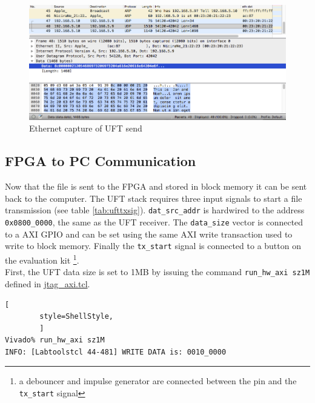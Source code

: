 \begin{figure}[b!]
    \centering
    \includegraphics[width=\textwidth] {images/validation/wiresharksend.png}
    \caption{Ethernet capture of UFT send}
    \label{fig:wiresharksend}
\end{figure}

%
%
\clearpage
\subsection{FPGA to PC Communication}
Now that the file is sent to the FPGA and stored in block memory it can be sent
back to the computer. The UFT stack requires three input signals to start a file
transmission (see table \ref{tab:ufttxsig}). \texttt{dat\_src\_addr} is
hardwired to the address \texttt{0x0800\_0000}, the same as the UFT receiver.
The \texttt{data\_size} vector is connected to a AXI GPIO and can be set using
the same AXI write transaction used to write to block memory. Finally the
\texttt{tx\_start} signal is connected to a button on the evaluation kit
\footnote{a debouncer and impulse generator are connected between the pin and
the \texttt{tx\_start} signal}. 
\\

First, the UFT data size is set to 1MB by issuing the command 
\texttt{run\_hw\_axi sz1M} defined in \url{jtag_axi.tcl}.

\vspace{1ex}
    \begin{lstlisting}[
        style=ShellStyle, 
        ]
Vivado% run_hw_axi sz1M
INFO: [Labtoolstcl 44-481] WRITE DATA is: 0010_0000
\end{lstlisting}
\vspace{1ex}

